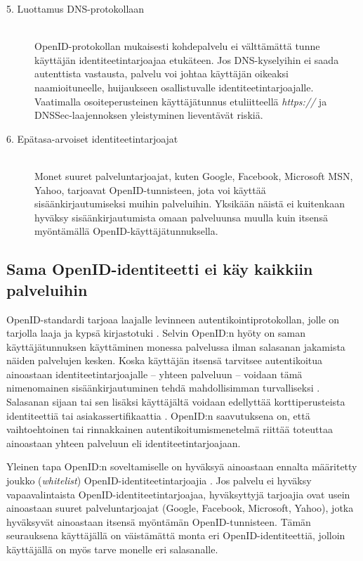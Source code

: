 \documentclass[english,gradu]{tktltiki}
\begin{document}
\begin{description}
  \item[5. Luottamus DNS-protokollaan] \hfill \\
    OpenID-protokollan mukaisesti kohdepalvelu ei välttämättä tunne käyttäjän identiteetintarjoajaa etukäteen.
    Jos DNS-kyselyihin ei saada autenttista vastausta, palvelu voi johtaa käyttäjän oikeaksi naamioituneelle,
    huijaukseen osallistuvalle identiteetintarjoajalle. Vaatimalla osoiteperusteinen käyttäjätunnus
    etuliitteellä \emph{https://} ja DNSSec-laajennoksen yleistyminen lieventävät riskiä.

   \item[6. Epätasa-arvoiset identiteetintarjoajat] \hfill \\
      Monet suuret palveluntarjoajat, kuten Google, Facebook, Microsoft MSN, Yahoo, tarjoavat OpenID-tunnisteen,
      jota voi käyttää sisäänkirjautumiseksi muihin palveluihin. Yksikään näistä ei kuitenkaan hyväksy
      sisäänkirjautumista omaan palveluunsa muulla kuin itsensä myöntämällä OpenID-käyttäjätunnuksella.

    \end{description}


\subsection{Sama OpenID-identiteetti ei käy kaikkiin palveluihin} %
\label{sub:sama_openid_identiteetti_ei_käy_kaikkiin_palveluihin}

OpenID-standardi tarjoaa laajalle levinneen autentikointiprotokollan, jolle on tarjolla laaja ja kypsä kirjastotuki \cite{openid_libraries}. Selvin OpenID:n hyöty on saman käyttäjätunnuksen käyttäminen monessa palvelussa ilman salasanan jakamista näiden palvelujen kesken. Koska käyttäjän itsensä tarvitsee autentikoitua ainoastaan identiteetintarjoajalle -- yhteen palveluun -- voidaan tämä nimenomainen sisäänkirjautuminen tehdä mahdollisimman turvalliseksi \cite{blackhat_openid_security_story}. Salasanan sijaan tai sen lisäksi käyttäjältä voidaan edellyttää korttiperusteista identiteettiä \cite{cameron_infocard_07} tai asiakassertifikaattia \cite{henry_story_foaf_ssl}. OpenID:n saavutuksena on, että vaihtoehtoinen tai rinnakkainen autentikoitumismenetelmä riittää toteuttaa ainoastaan yhteen palveluun eli identiteetintarjoajaan.

Yleinen tapa OpenID:n soveltamiselle on hyväksyä ainoastaan ennalta määritetty joukko (\emph{whitelist})
OpenID-identiteetintarjoajia \cite{openid_seven_sites_mailinglist, openid_tech_or_movement}. Jos palvelu ei
hyväksy vapaavalintaista OpenID-identiteetintarjoajaa, hyväksyttyjä tarjoajia ovat usein ainoastaan suuret
palveluntarjoajat (Google, Facebook, Microsoft, Yahoo), jotka hyväksyvät ainoastaan itsensä myöntämän
OpenID-tunnisteen. Tämän seurauksena käyttäjällä on väistämättä monta eri OpenID-identiteettiä, jolloin
käyttäjällä on myös tarve monelle eri salasanalle.
\end{document}
